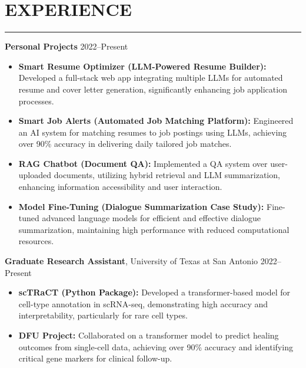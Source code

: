 \documentclass[9pt,letterpaper]{extarticle}
\newcommand{\sectionsep}{%
  \par
  \vspace{-3ex}%
  \noindent\rule{\textwidth}{0.4pt}%
  \vspace{0ex}%
  \par
}
\begin{document}
\section*{EXPERIENCE}
\sectionsep
\textbf{Personal Projects}  \hfill 2022--Present
\begin{itemize}
  \item \textbf{Smart Resume Optimizer (LLM-Powered Resume Builder):} Developed a full-stack web app integrating multiple LLMs for automated resume and cover letter generation, significantly enhancing job application processes.

  \item \textbf{Smart Job Alerts (Automated Job Matching Platform):} Engineered an AI system for matching resumes to job postings using LLMs, achieving over 90\% accuracy in delivering daily tailored job matches.

  \item \textbf{RAG Chatbot (Document QA):} Implemented a QA system over user-uploaded documents, utilizing hybrid retrieval and LLM summarization, enhancing information accessibility and user interaction.

  \item \textbf{Model Fine-Tuning (Dialogue Summarization Case Study):} Fine-tuned advanced language models for efficient and effective dialogue summarization, maintaining high performance with reduced computational resources.

\end{itemize}
\textbf{Graduate Research Assistant}, University of Texas at San Antonio \hfill 2022--Present
\begin{itemize}
  \item \textbf{scTRaCT (Python Package):} Developed a transformer-based model for cell-type annotation in scRNA-seq, demonstrating high accuracy and interpretability, particularly for rare cell types.

  \item \textbf{DFU Project:} Collaborated on a transformer model to predict healing outcomes from single-cell data, achieving over 90\% accuracy and identifying critical gene markers for clinical follow-up.

\end{itemize}

\end{document}
